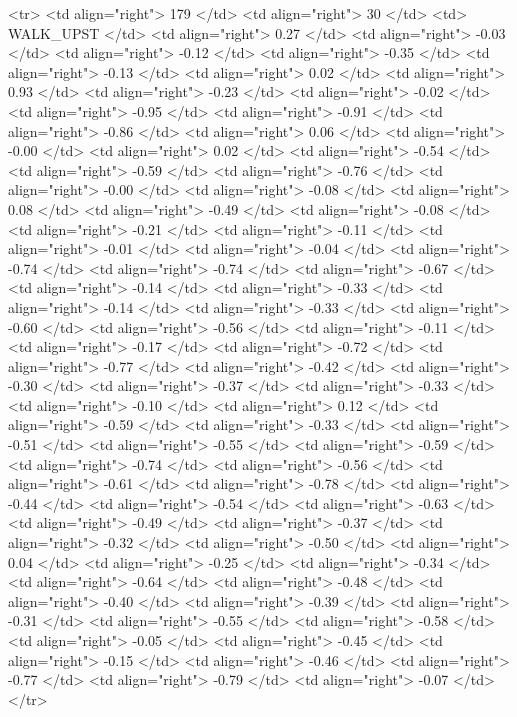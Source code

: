   <tr> <td align="right"> 179 </td> <td align="right">  30 </td> <td> WALK_UPST </td> <td align="right"> 0.27 </td> <td align="right"> -0.03 </td> <td align="right"> -0.12 </td> <td align="right"> -0.35 </td> <td align="right"> -0.13 </td> <td align="right"> 0.02 </td> <td align="right"> 0.93 </td> <td align="right"> -0.23 </td> <td align="right"> -0.02 </td> <td align="right"> -0.95 </td> <td align="right"> -0.91 </td> <td align="right"> -0.86 </td> <td align="right"> 0.06 </td> <td align="right"> -0.00 </td> <td align="right"> 0.02 </td> <td align="right"> -0.54 </td> <td align="right"> -0.59 </td> <td align="right"> -0.76 </td> <td align="right"> -0.00 </td> <td align="right"> -0.08 </td> <td align="right"> 0.08 </td> <td align="right"> -0.49 </td> <td align="right"> -0.08 </td> <td align="right"> -0.21 </td> <td align="right"> -0.11 </td> <td align="right"> -0.01 </td> <td align="right"> -0.04 </td> <td align="right"> -0.74 </td> <td align="right"> -0.74 </td> <td align="right"> -0.67 </td> <td align="right"> -0.14 </td> <td align="right"> -0.33 </td> <td align="right"> -0.14 </td> <td align="right"> -0.33 </td> <td align="right"> -0.60 </td> <td align="right"> -0.56 </td> <td align="right"> -0.11 </td> <td align="right"> -0.17 </td> <td align="right"> -0.72 </td> <td align="right"> -0.77 </td> <td align="right"> -0.42 </td> <td align="right"> -0.30 </td> <td align="right"> -0.37 </td> <td align="right"> -0.33 </td> <td align="right"> -0.10 </td> <td align="right"> 0.12 </td> <td align="right"> -0.59 </td> <td align="right"> -0.33 </td> <td align="right"> -0.51 </td> <td align="right"> -0.55 </td> <td align="right"> -0.59 </td> <td align="right"> -0.74 </td> <td align="right"> -0.56 </td> <td align="right"> -0.61 </td> <td align="right"> -0.78 </td> <td align="right"> -0.44 </td> <td align="right"> -0.54 </td> <td align="right"> -0.63 </td> <td align="right"> -0.49 </td> <td align="right"> -0.37 </td> <td align="right"> -0.32 </td> <td align="right"> -0.50 </td> <td align="right"> 0.04 </td> <td align="right"> -0.25 </td> <td align="right"> -0.34 </td> <td align="right"> -0.64 </td> <td align="right"> -0.48 </td> <td align="right"> -0.40 </td> <td align="right"> -0.39 </td> <td align="right"> -0.31 </td> <td align="right"> -0.55 </td> <td align="right"> -0.58 </td> <td align="right"> -0.05 </td> <td align="right"> -0.45 </td> <td align="right"> -0.15 </td> <td align="right"> -0.46 </td> <td align="right"> -0.77 </td> <td align="right"> -0.79 </td> <td align="right"> -0.07 </td> </tr>
